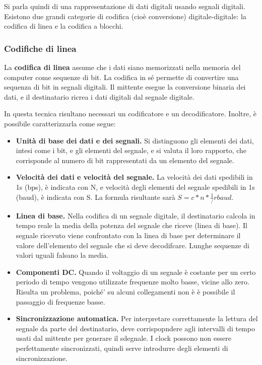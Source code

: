         Si parla quindi di una rappresentazione di dati digitali usando segnali digitali. Esistono due grandi categorie di codifica (cioè conversione) digitale-digitale: la codifica di linea e la codifica a blocchi.
    
        \subsubsection{Codifiche di linea}
        
            La \textbf{codifica di linea} assume che i dati siano memorizzati nella memoria del computer come sequenze di bit. La codifica in sé permette di convertire una sequenza di bit in segnali digitali. Il mittente esegue la conversione binaria dei dati, e il destinatario ricrea i dati digitali dal segnale digitale.
            
            In questa tecnica risultano necessari un codificatore e un decodificatore. Inoltre, è possibile caratterizzarla come segue:
            
            \begin{itemize}
                \item \textbf{Unità di base dei dati e dei segnali.} Si distinguono gli elementi dei dati, intesi come i bit, e gli elementi del segnale, e si valuta il loro rapporto, che corrisponde al numero di bit rappresentati da un elemento del segnale.
                \item \textbf{Velocità dei dati e velocità del segnale.} La velocità dei dati spedibili in 1s (bps), è indicata con N, e velocità degli elementi del segnale spedibili in 1s (baud), è indicata con S. La formula risultante sarà \(S=c*n*\frac{1}/r baud\).
                \item \textbf{Linea di base.} Nella codifica di un segnale digitale, il destinatario calcola in tempo reale la media della potenza del segnale che riceve (linea di base). Il segnale ricevuto viene confrontato con la linea di base per determinare il valore dell'elemento del segnale  che si deve decodifcare. Lunghe sequenze di valori uguali falsano la media.
                \item \textbf{Componenti DC.} Quando il voltaggio di un segnale è costante per un certo periodo di tempo vengono utilizzate frequenze molto basse, vicine allo zero. Risulta un problema, poiché' su alcuni collegamenti non è è possibile il passaggio di frequenze basse.
                \item \textbf{Sincronizzazione automatica.} Per interpretare correttamente la lettura del segnale da parte del destinatario, deve corrispopndere agli intervalli di tempo usati dal mittente per generare il sdegnale. I clock possono non essere perfettamente sincronizzati, quindi serve introdurre degli elementi di sincronizzazione.
            \end{itemize}
            
